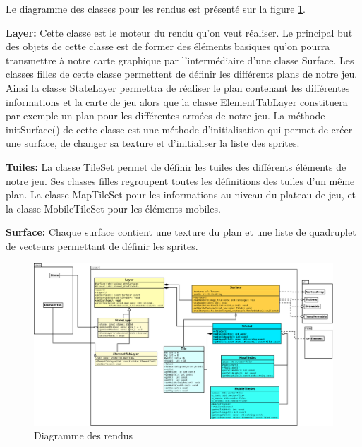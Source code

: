 Le diagramme des classes pour les rendus est présenté sur la figure \ref{fig:render}.

\textbf{Layer:} Cette classe est le moteur du rendu qu’on veut réaliser. Le principal but des objets de cette classe est de former des éléments basiques qu’on pourra transmettre à notre carte graphique par l’intermédiaire d’une classe Surface. Les classes filles de cette classe permettent de définir les différents plans de notre jeu. Ainsi la classe StateLayer permettra de réaliser le plan contenant les différentes informations et la carte de jeu alors que la classe ElementTabLayer constituera par exemple un plan pour les différentes armées de notre jeu.
La méthode initSurface() de cette classe est une méthode d'initialisation qui permet de créer une surface, de changer sa texture et d’initialiser la liste des sprites. 

\textbf{Tuiles:} La classe TileSet permet de définir les tuiles des différents éléments de notre jeu. Ses classes filles regroupent toutes les définitions des tuiles d’un même plan. La classe MapTileSet pour les informations au niveau du plateau de jeu, et la classe MobileTileSet pour les éléments mobiles.

\textbf{Surface:} Chaque surface contient une texture du plan et une liste de quadruplet de
vecteurs permettant de définir les sprites.




\begin{landscape}
    \begin{figure}[!htbp]
        \centering
        \includegraphics[width=21cm]{Images/render.png}
        \caption{Diagramme des rendus}
        \label{fig:render}
    \end{figure}
\end{landscape}
